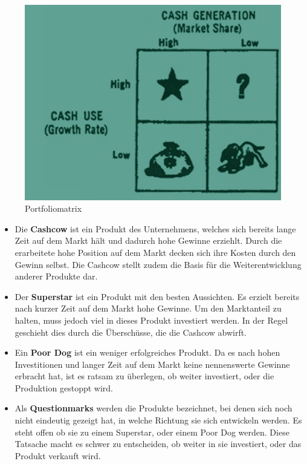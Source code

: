     \begin{figure}[H]
      \begin{centering}
      \includegraphics[width = 1\textwidth]{Bilder/portfoliomatrix.jpg}
      \par\end{centering}
      \caption[Portfoliomatrix]{Portfoliomatrix\cite{pic_matrix}}
      \label{matrix}
    \end{figure}

    \begin{itemize}
      \item Die \textbf{Cashcow} ist ein Produkt des Unternehmens, welches sich bereits lange Zeit auf dem Markt hält und dadurch hohe Gewinne erziehlt. Durch die
      erarbeitete hohe Position auf dem Markt decken sich ihre Kosten durch den Gewinn selbst. Die Cashcow stellt zudem die Basis für die Weiterentwicklung anderer
      Produkte dar.

      \item Der \textbf{Superstar} ist ein Produkt mit den besten Aussichten. Es erzielt bereits nach kurzer Zeit auf dem Markt hohe Gewinne. Um den Marktanteil
      zu halten, muss jedoch viel in dieses Produkt investiert werden. In der Regel geschieht dies durch die Überschüsse, die die Cashcow abwirft.

      \item Ein \textbf{Poor Dog} ist ein weniger erfolgreiches Produkt. Da es nach hohen Investitionen und langer Zeit auf dem Markt keine nennenswerte
      Gewinne erbracht hat, ist es ratsam zu überlegen, ob weiter investiert, oder die Produktion gestoppt wird.

      \item Als \textbf{Questionmarks} werden die Produkte bezeichnet, bei denen sich noch nicht eindeutig gezeigt hat, in welche Richtung sie sich entwickeln werden.
      Es steht offen ob sie zu einem Superstar, oder einem Poor Dog werden. Diese Tatsache macht es schwer zu entscheiden, ob weiter in sie investiert, oder das Produkt
      verkauft wird.
    \end{itemize}

